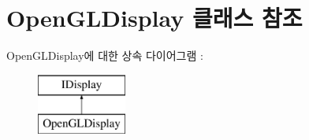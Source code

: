 \hypertarget{class_open_g_l_display}{}\section{Open\+G\+L\+Display 클래스 참조}
\label{class_open_g_l_display}
Open\+G\+L\+Display에 대한 상속 다이어그램 \+: \begin{figure}[H]
\begin{center}
\leavevmode
\includegraphics[height=2.000000cm]{class_open_g_l_display}
\end{center}
\end{figure}
